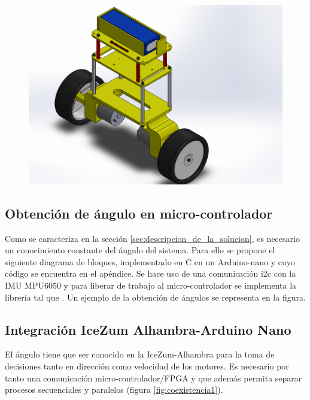 \begin{center}
	\begin{figure}[H]
		\center
		\includegraphics[trim = 20mm 0mm 20mm 0mm,clip, angle=0, scale = 0.8]{imagenes/Balancing_Robot/EnsanBalanceCab.PDF}
		\label{fig:diagramaGantt}
	\end{figure}
\end{center}
\subsection{Obtención de ángulo en micro-controlador}
Como se caracteriza en la sección \ref{sec:descripcion_de_la_solucion}, es necesario un conocimiento constante del ángulo del sistema. Para ello se propone el siguiente diagrama de bloques, implementado en C en un Arduino-nano y cuyo código se encuentra en el apéndice. \newline
Se hace uso de una comunicación i2c con la IMU MPU6050 y para liberar de trabajo al micro-controlador se implementa la librería tal que .\newline
Un ejemplo de la obtención de ángulos se representa en la figura.

\subsection{Integración IceZum Alhambra-Arduino Nano}
El ángulo tiene que ser conocido en la IceZum-Alhambra para la toma de decisiones tanto en dirección como velocidad de los motores. Es necesario por tanto una comunicación micro-controlador/FPGA y que además permita separar procesos secuenciales y paralelos (figura \ref{fig:coexistencia1}).

